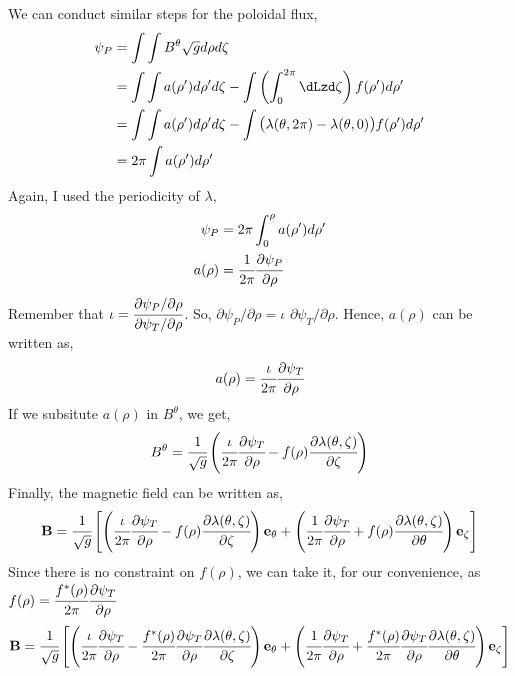 We can conduct similar steps for the poloidal flux,
\begin{align}
    \psi_P &= \int \int B^\theta \jac d\rho d\zeta \\
    &= \int \int a(\rho')d\rho' d\zeta - \int \left(\int_0^{2\pi}\dLzd\zeta\right) f(\rho')d\rho'  \\
    &= \int \int a(\rho')d\rho' d\zeta - \int \mathlarger{(} \lambda(\theta,2\pi) - \lambda(\theta,0)\mathlarger{)} f(\rho')d\rho'  \\
    &= 2\pi \int a(\rho')d\rho'
\end{align}
Again, I used the periodicity of $\lambda$,
\begin{align}
    \psi_P &= 2\pi \int_0^{\rho} a(\rho')d\rho' \\
    a(\rho) &= \cfrac{1}{2\pi}\cfrac{\partial \psi_P}{\partial\rho}
\end{align}
Remember that $\iota = \cfrac{\partial\psi_P/\partial\rho}{\partial\psi_T/\partial\rho}$. So,  $\partial\psi_P/\partial\rho = \iota$ $\partial\psi_T/\partial\rho$. Hence, $a(\rho)$ can be written as,
\begin{equation}
   a(\rho) = \cfrac{\iota}{2\pi}\cfrac{\partial \psi_T}{\partial\rho}
\end{equation}
If we subsitute $a(\rho)$ in $B^\theta$, we get,
\begin{equation}
    B^\theta = \cfrac{1}{\sqrt{g}}\left(\cfrac{\iota}{2\pi}\cfrac{\partial \psi_{T}}{\partial \rho} - f(\rho)\cfrac{\partial\lambda(\theta,\zeta)}{\partial\zeta}\right)
\end{equation}
Finally, the magnetic field can be written as,
\begin{equation}
    \mathbf{B} = \cfrac{1}{\sqrt{g}}\begin{bmatrix}
        \left(\cfrac{\iota}{2\pi}\cfrac{\partial \psi_{T}}{\partial \rho} - f(\rho)\cfrac{\partial\lambda(\theta,\zeta)}{\partial\zeta}\right)\mathbf{e}_\theta  +
        \left(\cfrac{1}{2\pi}\cfrac{\partial \psi_{T}}{\partial \rho} + f(\rho)\cfrac{\partial\lambda(\theta,\zeta)}{\partial\theta}\right) \mathbf{e}_\zeta
    \end{bmatrix}
\end{equation}
Since there is no constraint on $f(\rho)$, we can take it, for our convenience, as $f(\rho) = \cfrac{f^*(\rho)}{2\pi}\cfrac{\partial \psi_{T}}{\partial \rho}$ 
\begin{equation}
    \mathbf{B} = \cfrac{1}{\sqrt{g}}\begin{bmatrix}
        \left(\cfrac{\iota}{2\pi}\cfrac{\partial \psi_{T}}{\partial \rho} - \cfrac{f^*(\rho)}{2\pi}\cfrac{\partial \psi_{T}}{\partial \rho}\cfrac{\partial\lambda(\theta,\zeta)}{\partial\zeta}\right)\mathbf{e}_\theta  +
        \left(\cfrac{1}{2\pi}\cfrac{\partial \psi_{T}}{\partial \rho} + \cfrac{f^*(\rho)}{2\pi}\cfrac{\partial \psi_{T}}{\partial \rho}\cfrac{\partial\lambda(\theta,\zeta)}{\partial\theta}\right) \mathbf{e}_\zeta
    \end{bmatrix}
\end{equation}
